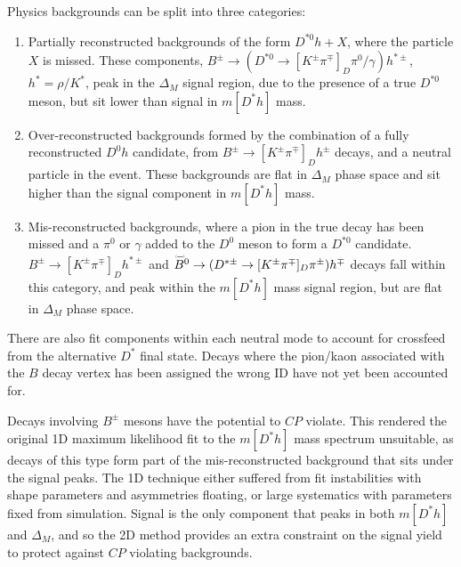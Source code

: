 \documentclass[oneside,12pt]{article}
\newcommand\brobor{\smash[b]{\raisebox{0.6\height}{\scalebox{0.5}{\tiny(}}{\mkern-1.5mu\scriptstyle-\mkern-1.5mu}\raisebox{0.6\height}{\scalebox{0.5}{\tiny)}}}}
\begin{document}
Physics backgrounds can be split into three categories:
\begin{enumerate}
  \item Partially reconstructed backgrounds of the form $D^{*0}h+X$, where the
    particle $X$ is missed. These components, $B^{\pm}\rightarrow
    (D^{*0}\rightarrow [K^{\pm}\pi^{\mp}]_D \pi^0/\gamma)h^{*\pm}$, $h^*=\rho/K^*$,
    peak in the $\Delta_M$ signal region, due to the presence of a true $D^{*0}$
    meson, but sit lower than signal in $m[D^*h]$ mass.
  \item Over-reconstructed backgrounds formed by the combination of a fully
    reconstructed $D^0h$ candidate, from $B^{\pm}\rightarrow
    [K^{\pm}\pi^{\mp}]_Dh^{\pm}$ decays, and a neutral particle in the event.
    These backgrounds are flat in $\Delta_M$ phase space and sit higher than the
    signal component in $m[D^*h]$ mass.
  \item Mis-reconstructed backgrounds, where a pion in the true decay has been missed and
    a $\pi^0$ or $\gamma$ added to the $D^0$ meson to form a $D^{*0}$ candidate.
    $B^{\pm}\rightarrow [K^{\pm}\pi^{\mp}]_Dh^{*\pm}$ and
    $\accentset{\brobor}{B}\phantom{}^{0}\rightarrow (D^{*\pm}\rightarrow
    [K^{\pm}\pi^{\mp}]_D \pi^{\pm})h^{\mp}$ decays fall within this category, and
    peak within the $m[D^*h]$ mass signal region, but are flat in $\Delta_M$ phase
    space.
\end{enumerate}

There are also fit components within each neutral mode to account for
crossfeed from the alternative $D^*$ final state. Decays where the pion/kaon
associated with the $B$ decay vertex has been assigned the wrong ID have not yet
been accounted for.

Decays involving $B^{\pm}$ mesons have the potential to $CP$ violate. This
rendered the original 1D maximum likelihood fit to the $m[D^*h]$ mass spectrum
unsuitable, as decays of this type form part of the mis-reconstructed
background that sits under the signal peaks. The 1D technique either suffered
from fit instabilities with shape parameters and asymmetries floating, or large
systematics with parameters fixed from simulation. Signal is the only component
that peaks in both $m[D^*h]$ and $\Delta_M$, and so the 2D method provides an
extra constraint on the signal yield to protect against $CP$ violating
backgrounds.
\end{document}
